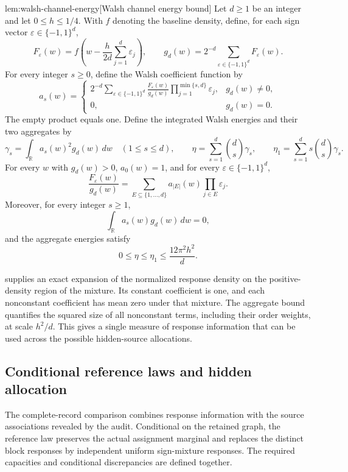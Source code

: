 \begin{lemmav}{lem:walsh-channel-energy}[Walsh channel energy bound]
Let \(d\ge1\) be an integer and let \(0\le h\le1/4\). With \(f\) denoting the baseline density, define, for each sign vector \(\varepsilon\in\{-1,1\}^d\),
\[
F_\varepsilon(w)
=f\!\left(w-\frac{h}{2d}\sum_{j=1}^d\varepsilon_j\right),
\qquad
g_d(w)=2^{-d}\sum_{\varepsilon\in\{-1,1\}^d}F_\varepsilon(w).
\]
For every integer \(s\ge0\), define the Walsh coefficient function by
\[
a_s(w)=
\begin{cases}
2^{-d}\displaystyle\sum_{\varepsilon\in\{-1,1\}^d}
\frac{F_\varepsilon(w)}{g_d(w)}
\displaystyle\prod_{j=1}^{\min\{s,d\}}\varepsilon_j,
& g_d(w)\ne0,\\
0,&g_d(w)=0.
\end{cases}
\]
The empty product equals one. Define the integrated Walsh energies and their two aggregates by
\[
\gamma_s=\int_{\mathbb R}a_s(w)^2g_d(w)\,dw
\quad(1\le s\le d),
\qquad
\eta=\sum_{s=1}^d\binom ds\gamma_s,
\qquad
\eta_1=\sum_{s=1}^d s\binom ds\gamma_s.
\]
For every \(w\) with \(g_d(w)>0\), \(a_0(w)=1\), and for every \(\varepsilon\in\{-1,1\}^d\),
\[
\frac{F_\varepsilon(w)}{g_d(w)}
=
\sum_{E\subseteq\{1,\ldots,d\}}
a_{|E|}(w)\prod_{j\in E}\varepsilon_j.
\]
Moreover, for every integer \(s\ge1\),
\[
\int_{\mathbb R}a_s(w)g_d(w)\,dw=0,
\]
and the aggregate energies satisfy
\[
0\le\eta\le\eta_1\le\frac{12\pi^2h^2}{d}.
\]
\end{lemmav}

 supplies an exact expansion of the normalized response density on the positive-density region of the mixture. Its constant coefficient is one, and each nonconstant coefficient has mean zero under that mixture. The aggregate bound quantifies the squared size of all nonconstant terms, including their order weights, at scale \(h^2/d\). This gives a single measure of response information that can be used across the possible hidden-source allocations.

\subsection{Conditional reference laws and hidden allocation}

The complete-record comparison combines response information with the source associations revealed by the audit. Conditional on the retained graph, the reference law preserves the actual assignment marginal and replaces the distinct block responses by independent uniform sign-mixture responses. The required capacities and conditional discrepancies are defined together.



